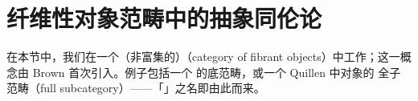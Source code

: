 
\providecommand{\rvF}{\mathbf{F}}  %
\providecommand{\rvW}{\mathbf{W}}  %
\providecommand{\rvWarrow}{\rightsquigarrow}%
\providecommand{\rvFarrow}{\twoheadrightarrow}%
\providecommand{\rvTFarrow}{\rightsquigarrow\joinrel\twoheadrightarrow}%

\section{纤维性对象范畴中的抽象同伦论}\label{sec:abstract-homotopy-theory-in-a-category-of-fibrant-objects}

在本节中，我们在一个（非富集的）\textbf{\trCategoryOfFibrantObjects}（category of fibrant
objects）中工作；这一概念由 Brown \cite{bib23} 首次引入。例子包括一个%
\trInfinityCosmos{}的底范畴，或一个 Quillen \trModelCategory{}中\trFibrant{}对象的
全子范畴（full subcategory）——「\trCategoryOfFibrantObjects」之名即由此而来。

